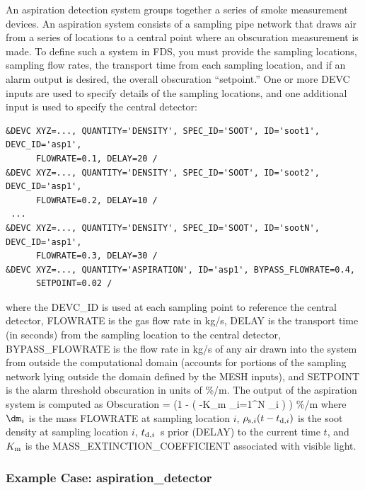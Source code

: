 \documentclass[11pt]{book}
\begin{document}
An aspiration detection system groups together a series of smoke measurement devices. An aspiration system consists of a sampling pipe network that draws air from a series of locations to a central point where an obscuration measurement is made.  To define such a system in FDS, you must provide the sampling locations, sampling flow rates, the transport time from each sampling location, and if an alarm output is desired, the overall obscuration ``setpoint.''  One or more {\ct DEVC} inputs are used to specify details of the sampling locations, and one additional input is used to specify the central detector:
\begin{lstlisting}
&DEVC XYZ=..., QUANTITY='DENSITY', SPEC_ID='SOOT', ID='soot1', DEVC_ID='asp1',
      FLOWRATE=0.1, DELAY=20 /
&DEVC XYZ=..., QUANTITY='DENSITY', SPEC_ID='SOOT', ID='soot2', DEVC_ID='asp1',
      FLOWRATE=0.2, DELAY=10 /
 ...
&DEVC XYZ=..., QUANTITY='DENSITY', SPEC_ID='SOOT', ID='sootN', DEVC_ID='asp1',
      FLOWRATE=0.3, DELAY=30 /
&DEVC XYZ=..., QUANTITY='ASPIRATION', ID='asp1', BYPASS_FLOWRATE=0.4,
      SETPOINT=0.02 /
\end{lstlisting}
where the {\ct DEVC\_ID} is used at each sampling point to reference the central detector, {\ct FLOWRATE} is the gas flow rate in kg/s, {\ct DELAY} is the transport time (in seconds) from the sampling location to the central detector, {\ct BYPASS\_FLOWRATE} is the flow rate in kg/s of any air drawn into the system from outside the computational
domain (accounts for portions of the sampling network lying outside the domain defined by the {\ct MESH} inputs), and {\ct SETPOINT} is the alarm threshold obscuration in units of \%/m. The output of the aspiration system is computed as
\be
  \hbox{Obscuration}  = \left(1 - \exp \left( -K_{\rm m}  {\sum_{i=1}^N{ \dm_i} } \right)  \right)   \; \; \hbox{\%/m}
\ee
where $\dm_i$ is the mass {\ct FLOWRATE} at sampling location $i$, $\rho_{{\rm s},i}( t-t_{{\rm d},i})$ is the soot density at sampling location $i$, $t_{{\rm d},i}$~s prior ({\ct DELAY}) to the current time $t$, and $K_{\rm m}$ is the {\ct MASS\_EXTINCTION\_COEFFICIENT} associated with visible light.

\subsubsection{Example Case: aspiration\_detector}
\label{aspiration_detector}
\end{document}
